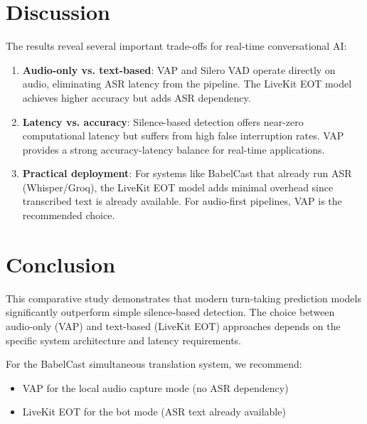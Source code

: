 \documentclass[conference]{IEEEtran}
\begin{document}
\section{Discussion}

The results reveal several important trade-offs for real-time conversational AI:

\begin{enumerate}
    \item \textbf{Audio-only vs. text-based}: VAP and Silero VAD operate directly
          on audio, eliminating ASR latency from the pipeline. The LiveKit EOT model
          achieves higher accuracy but adds ASR dependency.

    \item \textbf{Latency vs. accuracy}: Silence-based detection offers near-zero
          computational latency but suffers from high false interruption rates.
          VAP provides a strong accuracy-latency balance for real-time applications.

    \item \textbf{Practical deployment}: For systems like BabelCast that already
          run ASR (Whisper/Groq), the LiveKit EOT model adds minimal overhead
          since transcribed text is already available. For audio-first pipelines,
          VAP is the recommended choice.
\end{enumerate}

\section{Conclusion}

This comparative study demonstrates that modern turn-taking prediction models
significantly outperform simple silence-based detection. The choice between
audio-only (VAP) and text-based (LiveKit EOT) approaches depends on the
specific system architecture and latency requirements.

For the BabelCast simultaneous translation system, we recommend:
\begin{itemize}
    \item VAP for the local audio capture mode (no ASR dependency)
    \item LiveKit EOT for the bot mode (ASR text already available)
\end{itemize}
\end{document}
